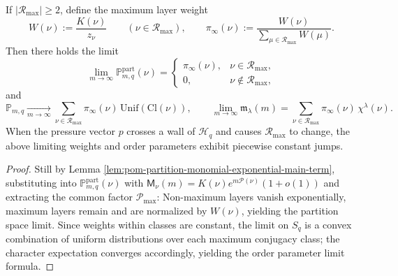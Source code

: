 \begin{theorem}\label{thm:pom-symmetric-group-gibbs-mixture}
If \(|\mathcal{R}_{\max}|\ge 2\), define the maximum layer weight
\[
W(\nu):=\frac{K(\nu)}{z_\nu}\qquad(\nu\in\mathcal{R}_{\max}),
\qquad
\pi_\infty(\nu):=\frac{W(\nu)}{\sum_{\mu\in\mathcal{R}_{\max}}W(\mu)}.
\]
Then there holds the limit
\[
\lim_{m\to\infty}\mathbb P^{\mathrm{part}}_{m,q}(\nu)=
\begin{cases}
\pi_\infty(\nu),& \nu\in\mathcal{R}_{\max},\\
0,& \nu\notin\mathcal{R}_{\max},
\end{cases}
\]
and
\[
\mathbb P_{m,q}\xrightarrow[m\to\infty]{}\sum_{\nu\in\mathcal{R}_{\max}}\pi_\infty(\nu)\,\mathrm{Unif}(\mathrm{Cl}(\nu)),
\qquad
\lim_{m\to\infty}\mathfrak m_\lambda(m)=\sum_{\nu\in\mathcal{R}_{\max}}\pi_\infty(\nu)\,\chi^\lambda(\nu).
\]
When the pressure vector \(p\) crosses a wall of \(\mathcal{H}_q\) and causes \(\mathcal{R}_{\max}\) to change, the above limiting weights and order parameters exhibit piecewise constant jumps.
\end{theorem}
\begin{proof}
Still by Lemma \ref{lem:pom-partition-monomial-exponential-main-term}, substituting into \(\mathbb P_{m,q}^{\mathrm{part}}(\nu)\) with
\(
\mathsf{M}_\nu(m)=K(\nu)e^{m\mathcal{P}(\nu)}(1+o(1))
\)
and extracting the common factor \(\mathcal{P}_{\max}\):
Non-maximum layers vanish exponentially, maximum layers remain and are normalized by \(W(\nu)\), yielding the partition space limit.
Since weights within classes are constant, the limit on \(S_q\) is a convex combination of uniform distributions over each maximum conjugacy class; the character expectation converges accordingly, yielding the order parameter limit formula.
\end{proof}




